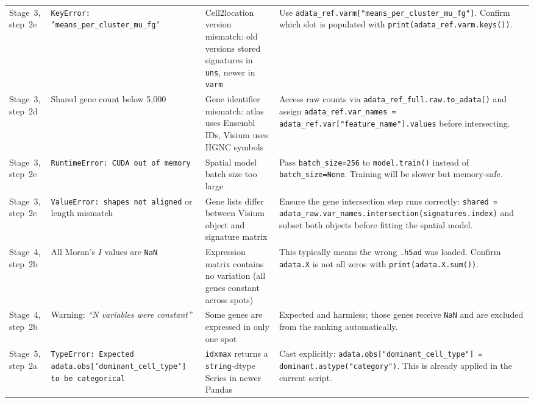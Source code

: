 \documentclass[12pt, a4paper]{article}
\begin{document}
\begin{longtable}{p{1.6cm} p{3.8cm} p{3.8cm} p{5.4cm}}
Stage~3, step~2e &
\texttt{KeyError: 'means\_per\_cluster\_mu\_fg'} &
Cell2location version mismatch: old versions stored signatures in
\texttt{uns}, newer in \texttt{varm} &
Use \texttt{adata\_ref.varm["means\_per\_cluster\_mu\_fg"]}.
Confirm which slot is populated with
\texttt{print(adata\_ref.varm.keys())}. \\[4pt]

Stage~3, step~2d &
Shared gene count below 5,000 &
Gene identifier mismatch: atlas uses Ensembl IDs, Visium uses
HGNC symbols &
Access raw counts via \texttt{adata\_ref\_full.raw.to\_adata()} and
assign \texttt{adata\_ref.var\_names = adata\_ref.var["feature\_name"].values}
before intersecting. \\[4pt]

Stage~3, step~2e &
\texttt{RuntimeError: CUDA out of memory} &
Spatial model batch size too large &
Pass \texttt{batch\_size=256} to \texttt{model.train()} instead of
\texttt{batch\_size=None}. Training will be slower but memory-safe. \\[4pt]

Stage~3, step~2e &
\texttt{ValueError: shapes not aligned} or length mismatch &
Gene lists differ between Visium object and signature matrix &
Ensure the gene intersection step runs correctly:
\texttt{shared = adata\_raw.var\_names.intersection(signatures.index)}
and subset both objects before fitting the spatial model. \\[4pt]

Stage~4, step~2b &
All Moran's $I$ values are \texttt{NaN} &
Expression matrix contains no variation (all genes constant across
spots) &
This typically means the wrong \texttt{.h5ad} was loaded.
Confirm \texttt{adata.X} is not all zeros with
\texttt{print(adata.X.sum())}. \\[4pt]

Stage~4, step~2b &
Warning: \textit{``N variables were constant''} &
Some genes are expressed in only one spot &
Expected and harmless; those genes receive \texttt{NaN} and are
excluded from the ranking automatically. \\[4pt]

Stage~5, step~2a &
\texttt{TypeError: Expected adata.obs['dominant\_cell\_type'] to be
categorical} &
\texttt{idxmax} returns a \texttt{string}-dtype Series in newer Pandas &
Cast explicitly:
\texttt{adata.obs["dominant\_cell\_type"] = dominant.astype("category")}.
This is already applied in the current script. \\[4pt]


\end{longtable}
\end{document}
